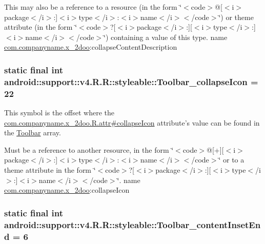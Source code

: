 This may also be a reference to a resource (in the form \char`\"{}$<$code$>$@\mbox{[}$<$i$>$package$<$/i$>$:\mbox{]}$<$i$>$type$<$/i$>$:$<$i$>$name$<$/i$>$$<$/code$>$\char`\"{}) or theme attribute (in the form \char`\"{}$<$code$>$?\mbox{[}$<$i$>$package$<$/i$>$:\mbox{]}\mbox{[}$<$i$>$type$<$/i$>$:\mbox{]}$<$i$>$name$<$/i$>$$<$/code$>$\char`\"{}) containing a value of this type.  name \hyperlink{namespacecom_1_1companyname_1_1x__2doo}{com.companyname.x\_\-2doo}:collapseContentDescription \hypertarget{classandroid_1_1support_1_1v4_1_1_r_1_1styleable_67413495dc779683b34ca10d393484e9}{
\subsubsection[{Toolbar\_\-collapseIcon}]{\setlength{\rightskip}{0pt plus 5cm}static final int android::support::v4.R.R::styleable::Toolbar\_\-collapseIcon = 22}}
\label{classandroid_1_1support_1_1v4_1_1_r_1_1styleable_67413495dc779683b34ca10d393484e9}


This symbol is the offset where the \hyperlink{classcom_1_1companyname_1_1x__2doo_1_1_r_1_1attr_ac9e7843fbcc98034ff18441100427e7}{com.companyname.x\_\-2doo.R.attr\#collapseIcon} attribute's value can be found in the \hyperlink{classandroid_1_1support_1_1v4_1_1_r_1_1styleable_0646d71cfbd4a8645c7d805b33e1c574}{Toolbar} array.

Must be a reference to another resource, in the form \char`\"{}$<$code$>$@\mbox{[}+\mbox{]}\mbox{[}$<$i$>$package$<$/i$>$:\mbox{]}$<$i$>$type$<$/i$>$:$<$i$>$name$<$/i$>$$<$/code$>$\char`\"{} or to a theme attribute in the form \char`\"{}$<$code$>$?\mbox{[}$<$i$>$package$<$/i$>$:\mbox{]}\mbox{[}$<$i$>$type$<$/i$>$:\mbox{]}$<$i$>$name$<$/i$>$$<$/code$>$\char`\"{}.  name \hyperlink{namespacecom_1_1companyname_1_1x__2doo}{com.companyname.x\_\-2doo}:collapseIcon \hypertarget{classandroid_1_1support_1_1v4_1_1_r_1_1styleable_a11d101535df2818c53046e1bbf21eb3}{
\subsubsection[{Toolbar\_\-contentInsetEnd}]{\setlength{\rightskip}{0pt plus 5cm}static final int android::support::v4.R.R::styleable::Toolbar\_\-contentInsetEnd = 6}}
\label{classandroid_1_1support_1_1v4_1_1_r_1_1styleable_a11d101535df2818c53046e1bbf21eb3}


